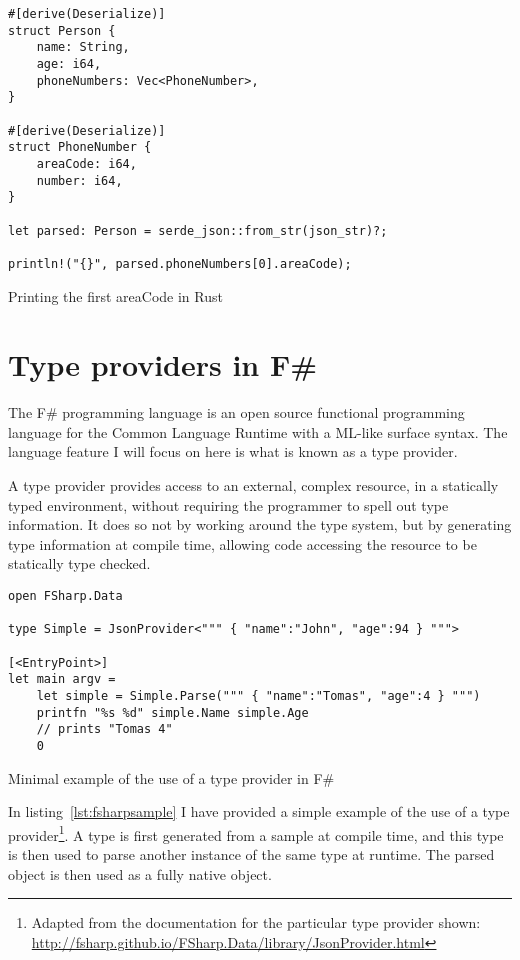 \begin{listing}[ht!]
\begin{verbatim}
#[derive(Deserialize)]
struct Person {
    name: String,
    age: i64,
    phoneNumbers: Vec<PhoneNumber>,
}

#[derive(Deserialize)]
struct PhoneNumber {
    areaCode: i64,
    number: i64,
}

let parsed: Person = serde_json::from_str(json_str)?;

println!("{}", parsed.phoneNumbers[0].areaCode);
\end{verbatim}
\caption{Printing the first areaCode in Rust}
\label{lst:readjsonrs3}
\end{listing}

\section{Type providers in F\#}

The F\# programming language is an open source functional programming language for the Common Language Runtime with a ML-like surface syntax. The language feature I will focus on here is what is known as a type provider.

A type provider provides access to an external, complex resource, in a statically typed environment, without requiring the programmer to spell out type information. It does so not by working around the type system, but by generating type information at compile time, allowing code accessing the resource to be statically type checked.

\begin{listing}[ht!]
\begin{verbatim}
open FSharp.Data

type Simple = JsonProvider<""" { "name":"John", "age":94 } """>

[<EntryPoint>]
let main argv =
    let simple = Simple.Parse(""" { "name":"Tomas", "age":4 } """)
    printfn "%s %d" simple.Name simple.Age
    // prints "Tomas 4"
    0
\end{verbatim}
\caption{Minimal example of the use of a type provider in F\#}
\label{lst:fsharpsample}
\end{listing}

In listing~\ref{lst:fsharpsample} I have provided a simple example of the use of a type provider\footnote{Adapted from the documentation for the particular type provider shown: \url{http://fsharp.github.io/FSharp.Data/library/JsonProvider.html}}. A type is first generated from a sample at compile time, and this type is then used to parse another instance of the same type at runtime. The parsed object is then used as a fully native object.

